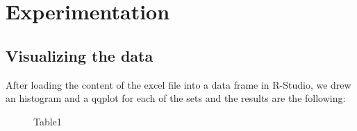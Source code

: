 \documentclass[12pt]{article}
\begin{document}
	\section{Experimentation}
		\subsection{Visualizing the data}
			
			After loading the content of the excel file into a data frame in R-Studio, we drew an histogram and a qqplot for each of the sets and the results are the following:
			
			\begin{figure}[H]
				\hfill
				\hfill
				\hfill
				\caption{Table1}
			\end{figure}
\end{document}
